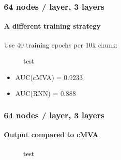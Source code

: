 \documentclass{beamer}
\begin{document}
\begin{frame}
  \frametitle{64 nodes / layer, 3 layers}
  \framesubtitle{A different training strategy}
  Use 40 training epochs per 10k chunk:

    \begin{figure}[htb]
    \centering

    \caption{test}
    \end{figure}

    \begin{itemize}
    \item AUC(cMVA) = 0.9233
    \item AUC(RNN) = 0.888
    \end{itemize}
\end{frame}

\begin{frame}
  \frametitle{64 nodes / layer, 3 layers}
  \framesubtitle{Output compared to cMVA}
  \begin{figure}[htb]
    \centering

    \caption{test}
  \end{figure}
\end{frame}
\end{document}
